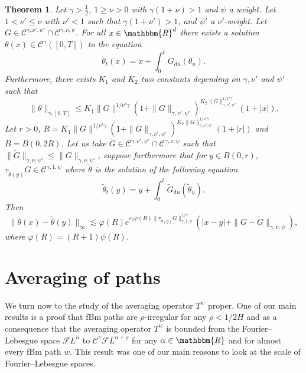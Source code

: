 \documentclass[a4paper,11pt]{article}
\newcommand{\mathd}{\mathrm{d}}
\newtheorem{theorem}{Theorem}[section]
\newcommand{\CC}{\mathscr C}
\newcommand{\CF}{\mathscr F}
\begin{document}
\begin{theorem}
  Let $\gamma > \frac{1}{2}$, $1 \geqslant \nu >0$ with $\gamma ( 1+ \nu ) >1$
  and $\psi$ a weight. Let $1< \nu' \leqslant \nu$ with $\nu' <1$ such that
  $\gamma ( 1+ \nu' ) >1$, and $\psi'$ a $\nu'$-weight. Let $G \in \CC^{\gamma
  , \nu' , \psi'} \cap \CC^{\gamma , \nu , \psi}$. For all $x \in
  \mathbbm{R}^{d}$ there exists a solution $\theta ( x ) \in \CC^{\gamma} ( [
  0,T ] )$ to the equation
  \[ \theta_{t} ( x ) =x+ \int_{0}^{t} G_{\mathd u} ( \theta_{u} ) . \]
  Furthermore, there exists $K_{1}$ and $K_{2}$ two constants depending on
  $\gamma , \nu'$ and $\psi'$ such that
  \[ _{} \| \theta \|_{\gamma , [ 0,T ]} \leqslant K_{1} \| G \|^{1/ \nu'
     \gamma} ( 1+ \| G \|_{\gamma , \nu' , \psi'} )^{K_{2} \| G \|_{\gamma ,
     \nu' , \psi'}^{1/ \nu' \gamma}} ( 1+ | x | ) . \]
  Let $r>0$, $R=K_{1} \| G \|^{1/ \nu' \gamma} ( 1+ \| G \|_{\gamma , \nu' ,
  \psi'} )^{K_{2} \| G \|_{\gamma , \nu' , \psi'}^{1/ \nu' \gamma}} ( 1+ | r |
  )$ and $B=B ( 0,2R )$. Let us take $\tilde{G} \in \CC^{\gamma , \nu' ,
  \psi'} \cap \CC^{\gamma , \nu , \psi}$ such that $\| \tilde{G} \|_{\gamma ,
  \nu , \psi'} \leqslant \| G \|_{\gamma , \nu , \psi'}$, suppose furthermore
  that for $y \in B ( 0,r )$, $\tau_{\tilde{\theta} ( y )} G \in \CC^{\gamma
  ,1, \psi}$ where $\tilde{\theta}$ is the solution of the following equation
  \[ \tilde{\theta}_{t} ( y ) =y+ \int_{0}^{t} \tilde{G}_{\mathd u} (
     \tilde{\theta}_{u} ) . \]
  Then
  \[ \| \theta ( x ) - \tilde{\theta} ( y ) \|_{\infty} \lesssim \varphi ( R )
     e^{c_{2} \varphi ( R ) \| \tau_{\tilde{\theta} ( y )} G \|_{\gamma ,1,
     \psi}^{1/ \gamma}} ( | x-y | + \| G- \tilde{G} \|_{\gamma , \nu , \psi} ),
  \]
  where $\varphi ( R ) = ( R+1 ) \psi ( R )$.
\end{theorem}

\section{Averaging of paths}\label{sec:averaging_deterministic}

We turn now to the study of the averaging operator $T^{w}$ proper. One of our
main results is a proof that fBm paths are $\rho$-irregular for any $\rho
<1/2H$ and as a consequence that the averaging operator $T^{w}$ is bounded
from the Fourier--Lebesgue space $\CF L^{\alpha}$ to $\CC^{\gamma} \CF L^{\alpha
+ \rho}$ for any $\alpha \in \mathbbm{R}$ and for almost every fBm path $w$.
This result was one of our main reasons to look at the scale of
Fourier--Lebesgue spaces.
\end{document}
